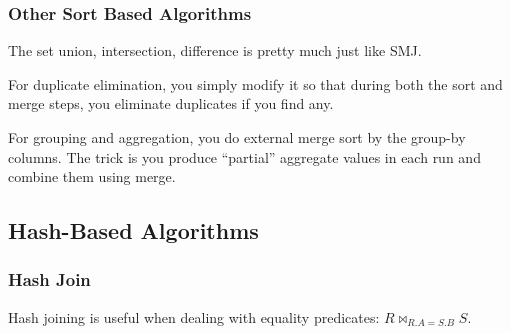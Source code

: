 \documentclass{article}
\begin{document}
    \subsubsection{Other Sort Based Algorithms}

      The set union, intersection, difference is pretty much just like SMJ. 

      For duplicate elimination, you simply modify it so that during both the sort and merge steps, you eliminate duplicates if you find any. 

      For grouping and aggregation, you do external merge sort by the group-by columns. The trick is you produce ``partial'' aggregate values in each run and combine them using merge. 

  \subsection{Hash-Based Algorithms}

    \subsubsection{Hash Join} 

      Hash joining is useful when dealing with equality predicates: $R \bowtie_{R.A = S.B} S$. 
\end{document}
